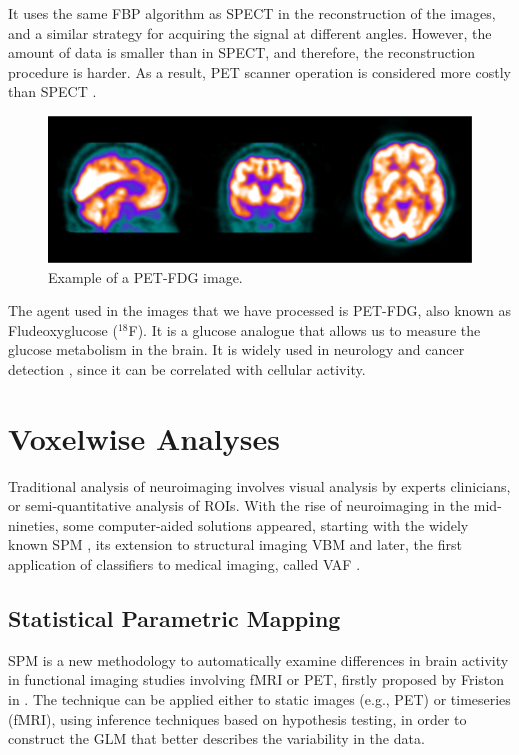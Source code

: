 It uses the same \ac{FBP} algorithm as \ac{SPECT} in the reconstruction of the images, and a similar strategy for acquiring the signal at different angles. However, the amount of data is smaller than in \ac{SPECT}, and therefore, the reconstruction procedure is harder. As a result, \ac{PET} scanner operation is considered more costly than \ac{SPECT} \cite{Carlson2016}.  

\begin{figure}[htp]
	\centering
	\includegraphics[width=0.7\linewidth]{gfx/ch1/example_PET}
	\caption[Example of a PET-FDG image.]{Example of a PET-FDG image.}
	\label{fig:example_PET}
\end{figure}

The agent used in the images that we have processed is PET-FDG, also known as Fludeoxyglucose ($^{18}$F). It is a glucose analogue that allows us to measure the glucose metabolism in the brain. It is widely used in neurology \cite{Newberg2002} and cancer detection \cite{Kelloff2005}, since it can be correlated with cellular activity. 


\section{Voxelwise Analyses}
Traditional analysis of neuroimaging involves visual analysis by experts clinicians, or semi-quantitative analysis of \acp{ROI}. With the rise of neuroimaging in the mid-nineties, some computer-aided solutions appeared, starting with the widely known \acf{SPM} \cite{Friston1994}, its extension to structural imaging \acf{VBM} \cite{Ashburner2000} and later, the first application of classifiers to medical imaging, called \acf{VAF} \cite{Stoeckel04}.

\subsection{Statistical Parametric Mapping}
\acf{SPM} is a new methodology to automatically examine differences in brain activity in functional imaging studies involving \ac{fMRI} or \ac{PET}, firstly proposed by Friston in \cite{Friston1994}. The technique can be applied either to static images (e.g., \ac{PET}) or timeseries (\ac{fMRI}), using inference techniques based on hypothesis testing, in order to construct the \ac{GLM} that better describes the variability in the data. 

